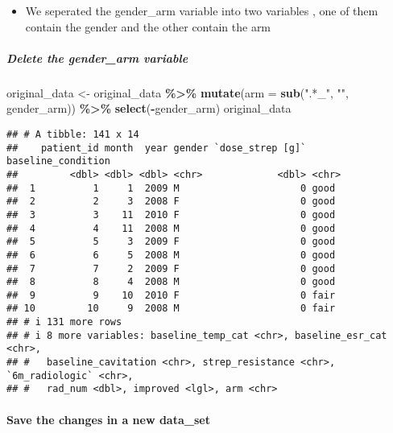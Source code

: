 \documentclass[
]{article}
\newenvironment{Shaded}{\begin{snugshade}}{\end{snugshade}}
\newcommand{\AttributeTok}[1]{\textcolor[rgb]{0.13,0.29,0.53}{#1}}
\newcommand{\FunctionTok}[1]{\textcolor[rgb]{0.13,0.29,0.53}{\textbf{#1}}}
\newcommand{\NormalTok}[1]{#1}
\newcommand{\OtherTok}[1]{\textcolor[rgb]{0.56,0.35,0.01}{#1}}
\newcommand{\SpecialCharTok}[1]{\textcolor[rgb]{0.81,0.36,0.00}{\textbf{#1}}}
\newcommand{\StringTok}[1]{\textcolor[rgb]{0.31,0.60,0.02}{#1}}
\providecommand{\tightlist}{%
  \setlength{\itemsep}{0pt}\setlength{\parskip}{0pt}}
\begin{document}
\begin{itemize}
\tightlist
\item
  We seperated the gender\_arm variable into two variables , one of them
  contain the gender and the other contain the arm
\end{itemize}

\subparagraph{Delete the gender\_arm
variable}\label{delete-the-gender_arm-variable}

\begin{Shaded}
\begin{Highlighting}[]
\NormalTok{original\_data }\OtherTok{\textless{}{-}}\NormalTok{ original\_data }\SpecialCharTok{\%\textgreater{}\%} 
      \FunctionTok{mutate}\NormalTok{(}\AttributeTok{arm =} \FunctionTok{sub}\NormalTok{(}\StringTok{".*\_"}\NormalTok{, }\StringTok{""}\NormalTok{, gender\_arm)) }\SpecialCharTok{\%\textgreater{}\%}
      \FunctionTok{select}\NormalTok{(}\SpecialCharTok{{-}}\NormalTok{gender\_arm) }
\NormalTok{original\_data }
\end{Highlighting}
\end{Shaded}

\begin{verbatim}
## # A tibble: 141 x 14
##    patient_id month  year gender `dose_strep [g]` baseline_condition
##         <dbl> <dbl> <dbl> <chr>             <dbl> <chr>             
##  1          1     1  2009 M                     0 good              
##  2          2     3  2008 F                     0 good              
##  3          3    11  2010 F                     0 good              
##  4          4    11  2008 M                     0 good              
##  5          5     3  2009 F                     0 good              
##  6          6     5  2008 M                     0 good              
##  7          7     2  2009 F                     0 good              
##  8          8     4  2008 M                     0 good              
##  9          9    10  2010 F                     0 fair              
## 10         10     9  2008 M                     0 fair              
## # i 131 more rows
## # i 8 more variables: baseline_temp_cat <chr>, baseline_esr_cat <chr>,
## #   baseline_cavitation <chr>, strep_resistance <chr>, `6m_radiologic` <chr>,
## #   rad_num <dbl>, improved <lgl>, arm <chr>
\end{verbatim}

\paragraph{Save the changes in a new
data\_set}\label{save-the-changes-in-a-new-data_set}
\end{document}

